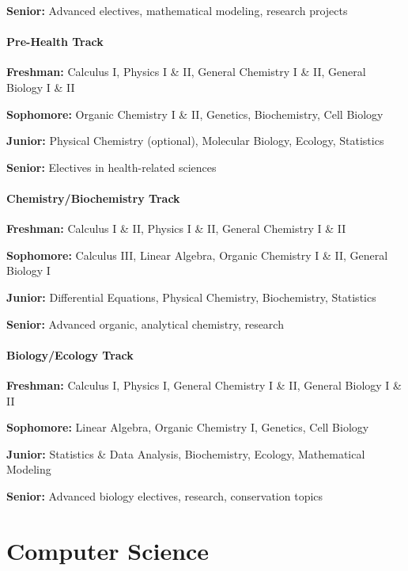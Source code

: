 \documentclass[12pt,oneside]{book}
\begin{document}
\textbf{Senior:} Advanced electives, mathematical modeling, research projects

\subsection*{Pre-Health Track}

\textbf{Freshman:} Calculus I, Physics I \& II, General Chemistry I \& II, General Biology I \& II

\textbf{Sophomore:} Organic Chemistry I \& II, Genetics, Biochemistry, Cell Biology

\textbf{Junior:} Physical Chemistry (optional), Molecular Biology, Ecology, Statistics

\textbf{Senior:} Electives in health-related sciences

\subsection*{Chemistry/Biochemistry Track}

\textbf{Freshman:} Calculus I \& II, Physics I \& II, General Chemistry I \& II

\textbf{Sophomore:} Calculus III, Linear Algebra, Organic Chemistry I \& II, General Biology I

\textbf{Junior:} Differential Equations, Physical Chemistry, Biochemistry, Statistics

\textbf{Senior:} Advanced organic, analytical chemistry, research

\subsection*{Biology/Ecology Track}

\textbf{Freshman:} Calculus I, Physics I, General Chemistry I \& II, General Biology I \& II

\textbf{Sophomore:} Linear Algebra, Organic Chemistry I, Genetics, Cell Biology

\textbf{Junior:} Statistics \& Data Analysis, Biochemistry, Ecology, Mathematical Modeling

\textbf{Senior:} Advanced biology electives, research, conservation topics


\part{Computer Science}
\end{document}
